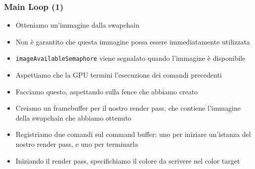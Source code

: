 \begin{frame}
\frametitle{Main Loop (1)}

\begin{itemize}
\item Otteniamo un'immagine dalla swapchain
\item Non è garantito che questa immagine possa essere immediatamente utilizzata
\item \texttt{imageAvailableSemaphore} viene segnalato quando l'immagine è disponibile
\item Aspettiamo che la GPU termini l'esecuzione dei comandi precedenti
\item Facciamo questo, aspettando sulla fence che abbiamo creato
\item Creiamo un framebuffer per il nostro render pass, che contiene l'immagine della swapchain che abbiamo ottenuto
\item Registriamo due comandi sul command buffer: uno per iniziare un'istanza del nostro render pass, e uno per terminarla
\item Iniziando il render pass, specifichiamo il colore da scrivere nel color target
\end{itemize}

\end{frame}

